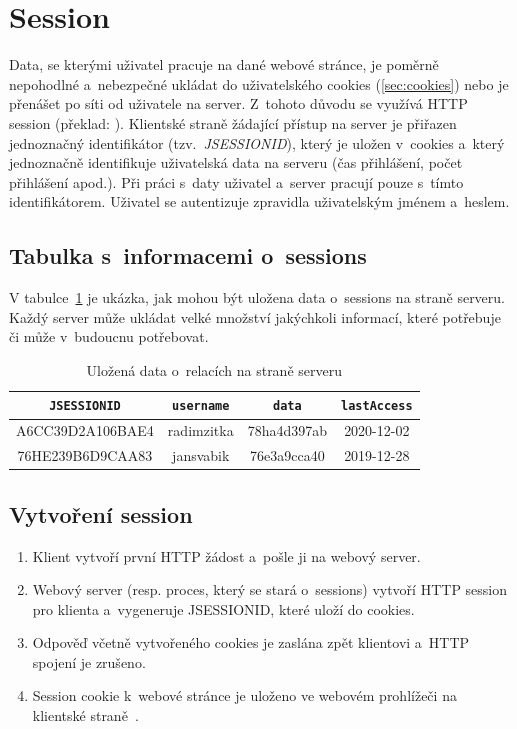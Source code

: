 \section{Session}
\label{sec:session}
Data, se kterými uživatel pracuje na dané webové stránce, je poměrně nepohodlné a~nebezpečné ukládat do uživatelského cookies (\ref{sec:cookies}) nebo je přenášet po síti od uživatele na server. Z~tohoto důvodu se využívá HTTP session (překlad: \textit{}). Klientské straně žádající přístup na server je přiřazen jednoznačný identifikátor (tzv.~\textit{JSESSIONID}), který je uložen v~cookies a~který jednoznačně identifikuje uživatelská data na serveru (čas přihlášení, počet přihlášení apod.). Při práci s~daty uživatel a~server pracují pouze s~tímto identifikátorem. Uživatel se autentizuje zpravidla uživatelským jménem a~heslem.

\subsection*{Tabulka s~informacemi o~sessions}
V tabulce~\ref{tab:session_cookie} je ukázka, jak mohou být uložena data o~sessions na straně serveru. Každý server může ukládat velké množství jakýchkoli informací, které potřebuje či může v~budoucnu potřebovat.

\begin{table}[H]
\centering
\label{tab:session_cookie}
\begin{tabular}{|c|c|c|c|}
\hline
\texttt{JSESSIONID} & \texttt{username} & \texttt{data} & \texttt{lastAccess} \\ \hline
A6CC39D2A106BAE4 & radimzitka & 78ha4d397ab & 2020-12-02 \\ \hline
76HE239B6D9CAA83& jansvabik & 76e3a9cca40 & 2019-12-28 \\ \hline
\end{tabular}
\caption{Uložená data o~relacích na straně serveru}
\end{table}

\subsection*{Vytvoření session}
\begin{enumerate}
  \item Klient vytvoří první HTTP žádost a~pošle ji na webový server.
  \item Webový server (resp. proces, který se stará o~sessions) vytvoří HTTP session pro klienta a~vygeneruje JSESSIONID, které uloží do cookies.
  \item Odpověď včetně vytvořeného cookies je zaslána zpět klientovi a~HTTP spojení je zrušeno.
  \item Session cookie k~webové stránce je uloženo ve webovém prohlížeči na klientské straně~\cite{bib:session_creating}.
\end{enumerate}

